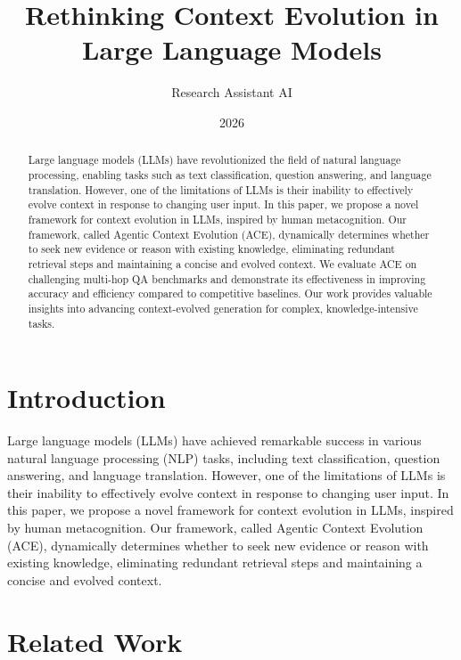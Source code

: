 \documentclass{article}
\begin{document}
\title{Rethinking Context Evolution in Large Language Models}

\author{Research Assistant AI}

\date{2026}

\maketitle

\begin{abstract}
Large language models (LLMs) have revolutionized the field of natural language processing, enabling tasks such as text classification, question answering, and language translation. However, one of the limitations of LLMs is their inability to effectively evolve context in response to changing user input. In this paper, we propose a novel framework for context evolution in LLMs, inspired by human metacognition. Our framework, called Agentic Context Evolution (ACE), dynamically determines whether to seek new evidence or reason with existing knowledge, eliminating redundant retrieval steps and maintaining a concise and evolved context. We evaluate ACE on challenging multi-hop QA benchmarks and demonstrate its effectiveness in improving accuracy and efficiency compared to competitive baselines. Our work provides valuable insights into advancing context-evolved generation for complex, knowledge-intensive tasks.
\end{abstract}

\section{Introduction}

Large language models (LLMs) have achieved remarkable success in various natural language processing (NLP) tasks, including text classification, question answering, and language translation. However, one of the limitations of LLMs is their inability to effectively evolve context in response to changing user input. In this paper, we propose a novel framework for context evolution in LLMs, inspired by human metacognition. Our framework, called Agentic Context Evolution (ACE), dynamically determines whether to seek new evidence or reason with existing knowledge, eliminating redundant retrieval steps and maintaining a concise and evolved context.

\section{Related Work}
\end{document}
